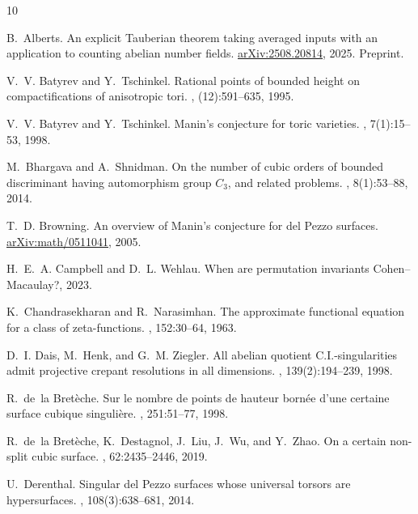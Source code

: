 \begin{thebibliography}{10}

B.~Alberts.
\newblock An explicit {Tauberian} theorem taking averaged inputs with an
  application to counting abelian number fields.
\newblock \href{https://arxiv.org/abs/2508.20814}{arXiv:2508.20814}, 2025.
\newblock Preprint.

V.~V. Batyrev and Y.~Tschinkel.
\newblock Rational points of bounded height on compactifications of anisotropic
  tori.
, (12):591--635, 1995.

V.~V. Batyrev and Y.~Tschinkel.
\newblock Manin's conjecture for toric varieties.
, 7(1):15--53, 1998.

M.~Bhargava and A.~Shnidman.
\newblock On the number of cubic orders of bounded discriminant having
  automorphism group {$C_3$}, and related problems.
, 8(1):53--88, 2014.

T.~D. Browning.
\newblock An overview of {Manin}'s conjecture for del {Pezzo} surfaces.
\newblock \href{https://arxiv.org/abs/math/0511041}{arXiv:math/0511041}, 2005.

H.~E.~A. Campbell and D.~L. Wehlau.
\newblock When are permutation invariants {C}ohen--{M}acaulay?, 2023.

K.~Chandrasekharan and R.~Narasimhan.
\newblock The approximate functional equation for a class of zeta-functions.
, 152:30--64, 1963.

D.~I. Dais, M.~Henk, and G.~M. Ziegler.
\newblock All abelian quotient {C}.{I}.-singularities admit projective crepant
  resolutions in all dimensions.
, 139(2):194--239, 1998.

R.~de~la Bret\`eche.
\newblock Sur le nombre de points de hauteur born\'ee d'une certaine surface
  cubique singuli\`ere.
, 251:51--77, 1998.

R.~de~la Bret\`eche, K.~Destagnol, J.~Liu, J.~Wu, and Y.~Zhao.
\newblock On a certain non-split cubic surface.
, 62:2435--2446, 2019.

U.~Derenthal.
\newblock Singular del {Pezzo} surfaces whose universal torsors are
  hypersurfaces.
,
  108(3):638--681, 2014.


\end{thebibliography}

